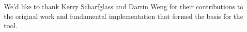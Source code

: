 \documentclass[smallextended]{svjour3}       %
\begin{document}
%
%
%


\begin{acknowledgements}
We'd like to thank Kerry Scharfglass and Darrin Weng for their contributions
to the original work \citep{scharfglass2012breaking} and fundamental
implementation that formed the basis for the tool.
\end{acknowledgements}

\end{document}
